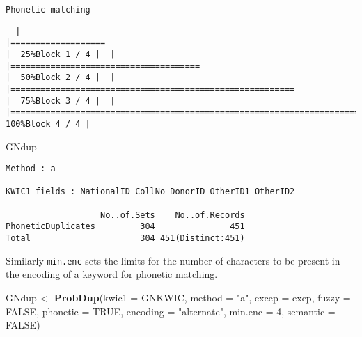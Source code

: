 \documentclass[
]{article}
\newenvironment{Shaded}{\begin{snugshade}}{\end{snugshade}}
\newcommand{\DataTypeTok}[1]{\textcolor[rgb]{0.13,0.29,0.53}{#1}}
\newcommand{\DecValTok}[1]{\textcolor[rgb]{0.00,0.00,0.81}{#1}}
\newcommand{\KeywordTok}[1]{\textcolor[rgb]{0.13,0.29,0.53}{\textbf{#1}}}
\newcommand{\NormalTok}[1]{#1}
\newcommand{\OtherTok}[1]{\textcolor[rgb]{0.56,0.35,0.01}{#1}}
\newcommand{\StringTok}[1]{\textcolor[rgb]{0.31,0.60,0.02}{#1}}
\begin{document}
\begin{verbatim}
Phonetic matching
\end{verbatim}

\begin{verbatim}
  |                                                                                    |===================                                                         |  25%Block 1 / 4 |  |                                                                                    |======================================                                      |  50%Block 2 / 4 |  |                                                                                    |=========================================================                   |  75%Block 3 / 4 |  |                                                                                    |============================================================================| 100%Block 4 / 4 |
\end{verbatim}

\begin{Shaded}
\begin{Highlighting}[]
\NormalTok{GNdup}
\end{Highlighting}
\end{Shaded}

\begin{verbatim}
Method : a

KWIC1 fields : NationalID CollNo DonorID OtherID1 OtherID2
 
                   No..of.Sets    No..of.Records
PhoneticDuplicates         304               451
Total                      304 451(Distinct:451)
\end{verbatim}

Similarly \texttt{min.enc} sets the limits for the number of characters
to be present in the encoding of a keyword for phonetic matching.

\begin{Shaded}
\begin{Highlighting}[]
\NormalTok{GNdup <-}\StringTok{ }\KeywordTok{ProbDup}\NormalTok{(}\DataTypeTok{kwic1 =}\NormalTok{ GNKWIC, }\DataTypeTok{method =} \StringTok{"a"}\NormalTok{, }\DataTypeTok{excep =}\NormalTok{ exep, }
                 \DataTypeTok{fuzzy =} \OtherTok{FALSE}\NormalTok{,}
                 \DataTypeTok{phonetic =} \OtherTok{TRUE}\NormalTok{, }\DataTypeTok{encoding =} \StringTok{"alternate"}\NormalTok{, }\DataTypeTok{min.enc =} \DecValTok{4}\NormalTok{,}
                 \DataTypeTok{semantic =} \OtherTok{FALSE}\NormalTok{)}
\end{Highlighting}
\end{Shaded}
\end{document}
